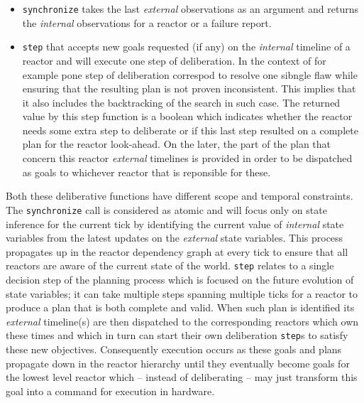 \begin{itemize}

\item \texttt{synchronize} takes the last {\em external} observations
  as an argument and returns the {\em internal} observations for a
  reactor or a failure report.

\item \texttt{step} that accepts new goals requested (if any) on the
  {\em internal} timeline of a reactor and will execute one step of
  deliberation. In the context of \eu for example pone step of
  deliberation correspod to resolve one sibngle flaw while ensuring
  that the resulting plan is not proven inconsistent. This implies
  that it also includes the backtracking of the search in such case. 
  The returned value by this step function is a boolean which
  indicates whether the reactor needs some extra step to deliberate or
  if this last step resulted on a complete plan for the reactor
  look-ahead. On the later, the part of the plan that concern this
  reactor {\em external} timelines is provided in order to be
  dispatched as goals to whichever reactor that is reponsible for
  these. 
\end{itemize}

Both these deliberative functions have different scope and temporal
constraints. The \texttt{synchronize} call is considered as atomic and
will focus only on state inference for the current tick by identifying
the current value of {\em internal} state variables from the latest
updates on the {\em external} state variables. This process propagates
up in the reactor dependency graph at every tick to ensure that all
reactors are aware of the current state of the world. \texttt{step}
relates to a single decision step of the planning process which is
focused on the future evolution of state variables; it can take
multiple steps spanning multiple ticks for a reactor to produce a plan
that is both complete and valid. When such plan is identified
 its {\em external}
timeline(s) are then dispatched to the corresponding reactors which
own these times and which in turn can start their own deliberation
\texttt{step}s to satisfy these new objectives. Consequently execution
occurs as these goals and plans propagate down in the reactor
hierarchy until they eventually become goals for the lowest level
reactor which -- instead of deliberating -- may just transform this
goal into a command for execution in hardware.

